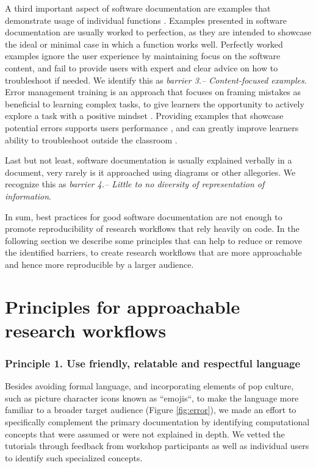 \documentclass[12pt]{article}
\begin{document}
A third important aspect of software documentation are examples that demonstrate
usage of individual functions \citep{karimzadeh2018top}.
Examples presented in software documentation are usually
worked to perfection, as they are intended to showcase the ideal or minimal case
in which a function works well.
Perfectly worked examples ignore the user experience by
maintaining focus on the software content, and fail to provide users with expert
and clear advice on how to troubleshoot if needed.
We identify this as \textit{barrier 3.-- Content-focused examples}.
Error management training is an approach that focuses on framing mistakes as beneficial
to learning complex tasks, to give learners the opportunity to
actively explore a task with a positive mindset \citep{frese1995error}.
Providing examples that showcase potential errors supports users performance \citep{steele2014error},
and can greatly improve learners ability to troubleshoot outside the classroom
\citep{shannon2015live, nederbragt2020ten}.

Last but not least, software documentation is usually explained verbally in a document, very
rarely is it approached using diagrams or other allegories.
We recognize this as \textit{barrier 4.-- Little to no diversity of representation of information}.

In sum, best practices for good software documentation are not enough to promote
reproducibility of research workflows that rely heavily on code. In the following
section we describe some principles that can help to reduce or remove the
identified barriers, to create
research workflows that are more approachable and hence more reproducible by a
larger audience.

\section*{Principles for approachable research workflows}
\label{sec:addressing}

\subsubsection*{Principle 1. Use friendly, relatable and respectful language}


Besides avoiding formal language, and incorporating elements of pop culture, such as picture
character icons known as ``emojis``, to make the language more familiar to a
broader target audience (Figure \ref{fig:error}), we made an effort to specifically
complement the primary documentation by identifying
computational concepts that were assumed or were not explained in depth.
We vetted the tutorials through feedback from workshop participants as well as
individual users to identify such specialized concepts.
\end{document}

